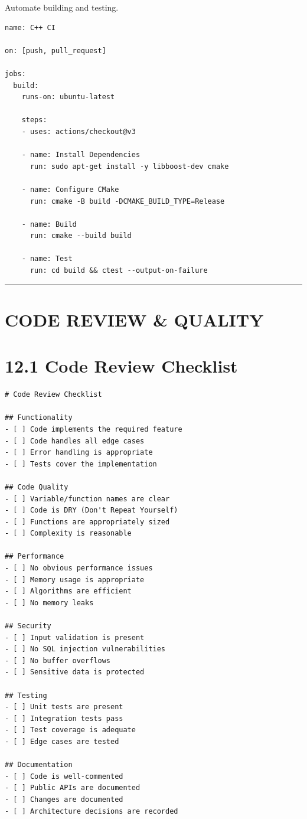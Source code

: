Automate building and testing.

\begin{lstlisting}
name: C++ CI

on: [push, pull_request]

jobs:
  build:
    runs-on: ubuntu-latest
    
    steps:
    - uses: actions/checkout@v3
    
    - name: Install Dependencies
      run: sudo apt-get install -y libboost-dev cmake
      
    - name: Configure CMake
      run: cmake -B build -DCMAKE_BUILD_TYPE=Release
      
    - name: Build
      run: cmake --build build
      
    - name: Test
      run: cd build && ctest --output-on-failure
\end{lstlisting}

\begin{center}\rule{0.5\linewidth}{0.5pt}\end{center}

\hypertarget{code-review-quality}{%
\section{CODE REVIEW \& QUALITY}\label{code-review-quality}}

\hypertarget{code-review-checklist}{%
\section{12.1 Code Review Checklist}\label{code-review-checklist}}

\begin{lstlisting}
# Code Review Checklist

## Functionality
- [ ] Code implements the required feature
- [ ] Code handles all edge cases
- [ ] Error handling is appropriate
- [ ] Tests cover the implementation

## Code Quality
- [ ] Variable/function names are clear
- [ ] Code is DRY (Don't Repeat Yourself)
- [ ] Functions are appropriately sized
- [ ] Complexity is reasonable

## Performance
- [ ] No obvious performance issues
- [ ] Memory usage is appropriate
- [ ] Algorithms are efficient
- [ ] No memory leaks

## Security
- [ ] Input validation is present
- [ ] No SQL injection vulnerabilities
- [ ] No buffer overflows
- [ ] Sensitive data is protected

## Testing
- [ ] Unit tests are present
- [ ] Integration tests pass
- [ ] Test coverage is adequate
- [ ] Edge cases are tested

## Documentation
- [ ] Code is well-commented
- [ ] Public APIs are documented
- [ ] Changes are documented
- [ ] Architecture decisions are recorded
\end{lstlisting}

